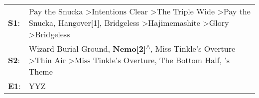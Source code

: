 \begin{supertabular}{p{0.03\textwidth}p{0.92\textwidth}}
 \textbf{S1}:  &  Pay the Snucka\textsuperscript{} \textgreater \enspace Intentions Clear\textsuperscript{} \textgreater \enspace The Triple Wide\textsuperscript{} \textgreater \enspace Pay the Snucka\textsuperscript{}, \enspace Hangover[1]\textsuperscript{}, \enspace Bridgeless\textsuperscript{} \textgreater \enspace Hajimemashite\textsuperscript{} \textgreater \enspace Glory\textsuperscript{} \textgreater \enspace Bridgeless\textsuperscript{}  \enspace  \\
 \textbf{S2}:  &                                                                                               Wizard Burial Ground\textsuperscript{}, \enspace \textbf{Nemo[2]\textsuperscript{$\wedge$}}, \enspace Miss Tinkle's Overture\textsuperscript{} \textgreater \enspace Thin Air\textsuperscript{} \textgreater \enspace Miss Tinkle's Overture\textsuperscript{}, \enspace The Bottom Half\textsuperscript{}, 's Theme\textsuperscript{}  \enspace  \\
 \textbf{E1}:  &                                                                                                                                                                                                                                                                                                                                                                                                                           YYZ\textsuperscript{}  \enspace  \\
\end{supertabular}
